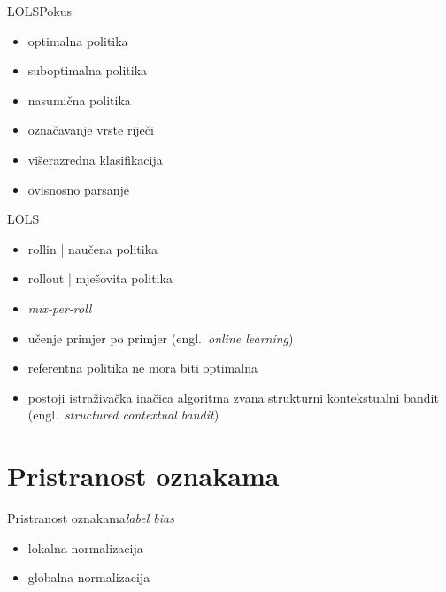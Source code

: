 \documentclass{beamer}
\newcommand{\engl}[1]{(engl.~\emph{#1})}
\begin{document}
\begin{frame}{\textsc{LOLS}}{Pokus}
  \begin{itemize}
  \item<1-> optimalna politika
  \item<1-> suboptimalna politika
  \item<1-> nasumična politika
  \end{itemize}
  \begin{itemize}
  \item<2-> označavanje vrste riječi
  \item<2-> višerazredna klasifikacija
  \item<2-> ovisnosno parsanje
  \end{itemize}
\end{frame}

\begin{frame}{\textsc{LOLS}}
  \begin{itemize}
  \item rollin | naučena politika
  \item rollout | mješovita politika
  \item \textit{mix-per-roll}
  \item učenje primjer po primjer \engl{online learning}
  \item referentna politika ne mora biti optimalna
  \item postoji istraživačka inačica algoritma zvana strukturni kontekstualni
  bandit \engl{structured contextual bandit}
  \end{itemize}
\end{frame}

\section{Pristranost oznakama}

\begin{frame}{Pristranost oznakama}{\protect\textit{label bias}}
  \begin{itemize}
  \item lokalna normalizacija
  \item globalna normalizacija
  \end{itemize}
\end{frame}
\end{document}
